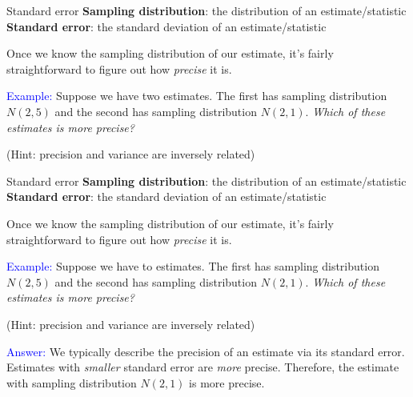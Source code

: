 \documentclass[10pt,t]{beamer}
\begin{document}
\begin{frame}{Standard error}
\textbf{Sampling distribution}: the distribution of an estimate/statistic
\textbf{Standard error}: the standard deviation of an estimate/statistic

\vspace{0.3cm} 

Once we know the sampling distribution of our estimate, it's fairly straightforward to figure out how \textit{precise} it is. 

\vspace{0.3cm}

\textcolor{blue}{Example:} Suppose we have two estimates. The first has sampling distribution $N(2, 5)$ and the second has sampling distribution $N(2, 1)$. \textit{Which of these estimates is more precise?}

\vspace{0.3cm}

\small (Hint: precision and variance are inversely related)


\end{frame}

\begin{frame}{Standard error}
\textbf{Sampling distribution}: the distribution of an estimate/statistic
\textbf{Standard error}: the standard deviation of an estimate/statistic

\vspace{0.3cm} 

Once we know the sampling distribution of our estimate, it's fairly straightforward to figure out how \textit{precise} it is. 

\vspace{0.3cm}

\textcolor{blue}{Example:} Suppose we have to estimates. The first has sampling distribution $N(2, 5)$ and the second has sampling distribution $N(2, 1)$. \textit{Which of these estimates is more precise?}

\vspace{0.3cm}

\small (Hint: precision and variance are inversely related)

\vspace{0.3cm}

\normalsize \textcolor{blue}{Answer:} We typically describe the precision of an estimate via its standard error. Estimates with \textit{smaller} standard error are \textit{more} precise. Therefore, the estimate with sampling distribution $N(2, 1)$ is more precise.
\end{frame}
\end{document}
